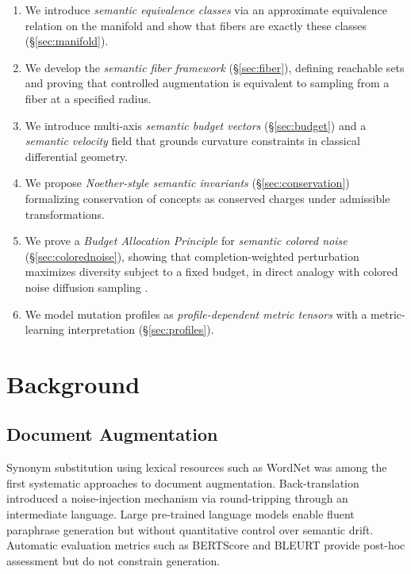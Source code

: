\documentclass[12pt, a4paper]{article}
\theoremstyle{plain}
\theoremstyle{definition}
\theoremstyle{remark}
\begin{document}
\begin{enumerate}[label=(\roman*)]
\item We introduce \emph{semantic equivalence classes} via an approximate
  equivalence relation on the manifold and show that fibers are exactly these
  classes (\S\ref{sec:manifold}).
\item We develop the \emph{semantic fiber framework} (\S\ref{sec:fiber}),
  defining reachable sets and proving that controlled augmentation is equivalent
  to sampling from a fiber at a specified radius.
\item We introduce multi-axis \emph{semantic budget vectors}
  (\S\ref{sec:budget}) and a \emph{semantic velocity} field that grounds
  curvature constraints in classical differential geometry.
\item We propose \emph{Noether-style semantic invariants} (\S\ref{sec:conservation})
  formalizing conservation of concepts as conserved charges under admissible
  transformations.
\item We prove a \emph{Budget Allocation Principle} for \emph{semantic colored
  noise} (\S\ref{sec:colorednoise}), showing that completion-weighted perturbation
  maximizes diversity subject to a fixed budget, in direct analogy with colored
  noise diffusion sampling \cite{davidson2026colorednoisediffusionsampling}.
\item We model mutation profiles as \emph{profile-dependent metric tensors}
  with a metric-learning interpretation (\S\ref{sec:profiles}).
\end{enumerate}


\section{Background}
\label{sec:background}

\subsection{Document Augmentation}

Synonym substitution using lexical resources such as WordNet
\cite{miller1995wordnet} was among the first systematic approaches to document
augmentation.  Back-translation \cite{sennrich2016backtranslation} introduced
a noise-injection mechanism via round-tripping through an intermediate language.
Large pre-trained language models \cite{raffel2020t5, brown2020gpt3} enable
fluent paraphrase generation but without quantitative control over semantic
drift.  Automatic evaluation metrics such as BERTScore \cite{zhang2020bertscore}
and BLEURT \cite{sellam2020bleurt} provide post-hoc assessment but do not
constrain generation.
\end{document}
